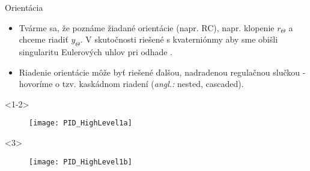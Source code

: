 \documentclass{beamer}
\newcommand{\angl}[1]{{\color{gray}(\emph{angl.:} #1)}}
\begin{document}
\begin{frame}[t]{Orientácia}
\begin{itemize}
  \item<1-> Tvárme sa, že poznáme žiadané orientácie (napr. RC), napr. klopenie $r_{\Theta}$ a chceme riadiť $y_{\Theta}$.  V skutočnosti riešené s kvaterniónmy aby sme obišli singularitu Eulerových uhlov pri odhade \citep{Erasmus2020}.
  \item<2-> Riadenie orientácie môže byť riešené ďalšou, nadradenou regulačnou slučkou - hovoríme o tzv. kaskádnom riadení \angl{nested, cascaded}.
  \end{itemize}


    \begin{onlyenv}<1-2>
  \begin{figure}
\centering
  \texttt{[image: PID\_HighLevel1a]}\\
\end{figure}
\end{onlyenv}



    \begin{onlyenv}<3>
  \begin{figure}
\centering
  \texttt{[image: PID\_HighLevel1b]}\\
\end{figure}
\end{onlyenv}

  \end{frame}
\end{document}
